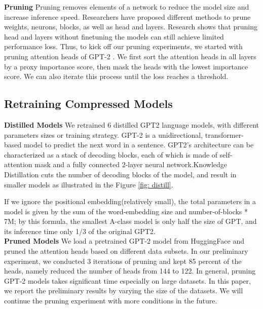 \noindent \textbf{Pruning} \quad Pruning removes elements of a network to reduce the model size and increase inference speed. Researchers have proposed different methods to prune weights, neurons, blocks, as well as head and layers. Research shows that pruning head and layers without finetuning the models can still achieve limited performance loss. Thus, to kick off our pruning experiments, we started with pruning attention heads of GPT-2 \cite{Michel2019AreSH}. We first sort the attention heads in all layers by a proxy importance score, then mask the heads with the lowest importance score. We can also iterate this process until the loss reaches a threshold.


\subsection{Retraining Compressed Models}

\noindent \textbf{Distilled Models} \quad 
We retrained 6 distilled GPT2 language models, with different parameters sizes or training strategy. GPT-2 \cite{Radford2019LanguageMA} is a unidirectional, transformer-based model to predict the next word in a sentence. GPT2's architecture can be characterized as a stack of decoding blocks, each of which is made of self-attention mask and a fully connected 2-layer neural network.Knowledge Distillation cuts the number of decoding blocks of the model, and result in smaller models as illustrated in the Figure \ref{fig: distill}.

If we ignore the positional embedding(relatively small), the total parameters in a model is given by the sum of the word-embedding size and number-of-blocks * 7M; by this formula, the smallest A-class model is only half the size of GPT, and its inference time only 1/3 of the original GPT2.\\

\noindent \textbf{Pruned Models} \quad 
We load a pretrained GPT-2 model from HuggingFace and pruned the attention heads based on different data subsets. In our preliminary experiment, we conducted 3 iterations of pruning and kept 85 percent of the heads, namely reduced the number of heads from 144 to 122. %
In general, pruning GPT-2 models takes significant time especially on large datasets. In this paper, we report the preliminary results by varying the size of the datasets. We will continue the pruning experiment with more conditions in the future.

